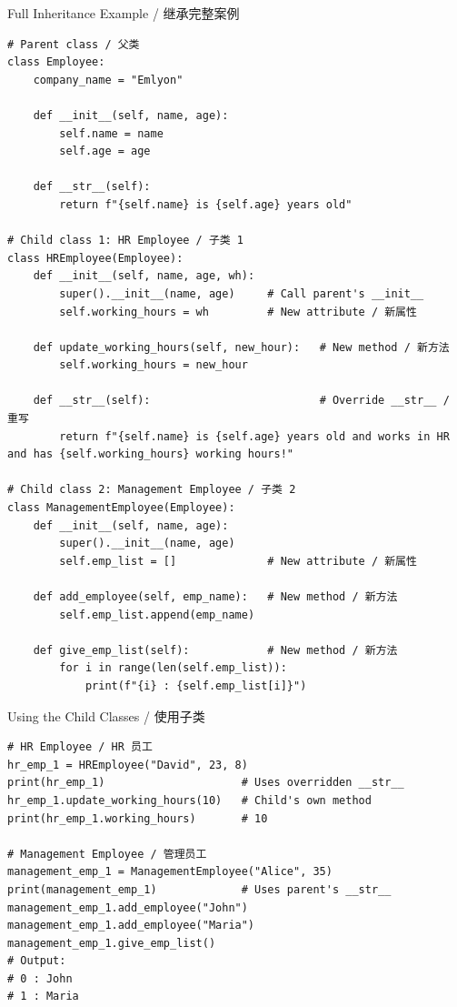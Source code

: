\documentclass[11pt,a4paper]{article}
\begin{document}
\begin{examplebox}{Full Inheritance Example / 继承完整案例}
\begin{lstlisting}
# Parent class / 父类
class Employee:
    company_name = "Emlyon"

    def __init__(self, name, age):
        self.name = name
        self.age = age

    def __str__(self):
        return f"{self.name} is {self.age} years old"

# Child class 1: HR Employee / 子类 1
class HREmployee(Employee):
    def __init__(self, name, age, wh):
        super().__init__(name, age)     # Call parent's __init__
        self.working_hours = wh         # New attribute / 新属性

    def update_working_hours(self, new_hour):   # New method / 新方法
        self.working_hours = new_hour

    def __str__(self):                          # Override __str__ / 重写
        return f"{self.name} is {self.age} years old and works in HR and has {self.working_hours} working hours!"

# Child class 2: Management Employee / 子类 2
class ManagementEmployee(Employee):
    def __init__(self, name, age):
        super().__init__(name, age)
        self.emp_list = []              # New attribute / 新属性

    def add_employee(self, emp_name):   # New method / 新方法
        self.emp_list.append(emp_name)

    def give_emp_list(self):            # New method / 新方法
        for i in range(len(self.emp_list)):
            print(f"{i} : {self.emp_list[i]}")
\end{lstlisting}
\end{examplebox}

\begin{examplebox}{Using the Child Classes / 使用子类}
\begin{lstlisting}
# HR Employee / HR 员工
hr_emp_1 = HREmployee("David", 23, 8)
print(hr_emp_1)                     # Uses overridden __str__
hr_emp_1.update_working_hours(10)   # Child's own method
print(hr_emp_1.working_hours)       # 10

# Management Employee / 管理员工
management_emp_1 = ManagementEmployee("Alice", 35)
print(management_emp_1)             # Uses parent's __str__
management_emp_1.add_employee("John")
management_emp_1.add_employee("Maria")
management_emp_1.give_emp_list()
# Output:
# 0 : John
# 1 : Maria
\end{lstlisting}
\end{examplebox}
\end{document}
